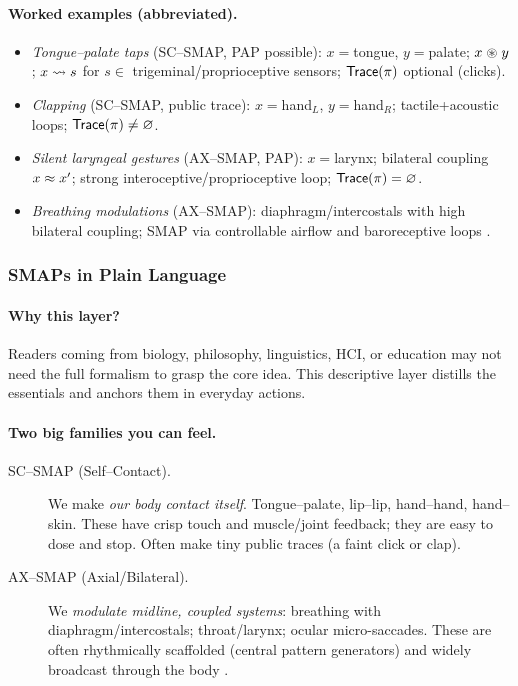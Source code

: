 \paragraph{Worked examples (abbreviated).}
\begin{itemize}
  \item \emph{Tongue--palate taps} (SC–SMAP, PAP possible): $x{=}$tongue, $y{=}$palate; $x\mathrel{\circledast} y$; $x\leadsto s$ for $s\in$ trigeminal/proprioceptive sensors; $\mathsf{Trace}(\pi)$ optional (clicks).
  \item \emph{Clapping} (SC–SMAP, public trace): $x{=}$hand$_L$, $y{=}$hand$_R$; tactile+acoustic loops; $\mathsf{Trace}(\pi)\neq\varnothing$.
  \item \emph{Silent laryngeal gestures} (AX–SMAP, PAP): $x{=}$larynx; bilateral coupling $x\mathrel{\approx} x'$; strong interoceptive/proprioceptive loop; $\mathsf{Trace}(\pi)=\varnothing$.
  \item \emph{Breathing modulations} (AX–SMAP): diaphragm/intercostals with high bilateral coupling; SMAP via controllable airflow and baroreceptive loops \citep{FeldmanDelNegro2006RespiratoryRhythm,DelNegro2018BreathingMatters}.
\end{itemize}

\subsubsection*{SMAPs in Plain Language}
\label{subsec:SMAP_plain}

\paragraph{Why this layer?}
Readers coming from biology, philosophy, linguistics, HCI, or education may not need the full formalism to grasp the core idea. This descriptive layer distills the essentials and anchors them in everyday actions.


\paragraph{Two big families you can feel.}
\begin{description}
  \item[SC–SMAP (Self–Contact).]
  We make \emph{our body contact itself}. Tongue–palate, lip–lip, hand–hand, hand–skin. These have crisp touch and muscle/joint feedback; they are easy to dose and stop. Often make tiny public traces (a faint click or clap).
  \item[AX–SMAP (Axial/Bilateral).]
  We \emph{modulate midline, coupled systems}: breathing with diaphragm/intercostals; throat/larynx; ocular micro-saccades. These are often rhythmically scaffolded (central pattern generators) and widely broadcast through the body \citep{FeldmanDelNegro2006RespiratoryRhythm,DelNegro2018BreathingMatters,Kelso1995DynamicPatterns}.
\end{description}

